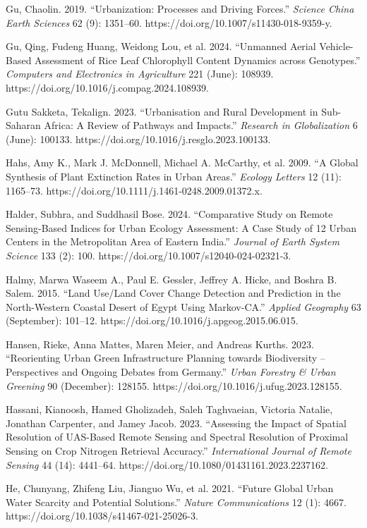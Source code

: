 Gu, Chaolin. 2019. ``Urbanization: Processes and Driving Forces.'' \emph{Science China Earth Sciences} 62 (9): 1351--60. https://doi.org/10.1007/s11430-018-9359-y.

Gu, Qing, Fudeng Huang, Weidong Lou, et al. 2024. ``Unmanned Aerial Vehicle-Based Assessment of Rice Leaf Chlorophyll Content Dynamics across Genotypes.'' \emph{Computers and Electronics in Agriculture} 221 (June): 108939. https://doi.org/10.1016/j.compag.2024.108939.

Gutu Sakketa, Tekalign. 2023. ``Urbanisation and Rural Development in Sub-Saharan Africa: A Review of Pathways and Impacts.'' \emph{Research in Globalization} 6 (June): 100133. https://doi.org/10.1016/j.resglo.2023.100133.

Hahs, Amy K., Mark J. McDonnell, Michael A. McCarthy, et al. 2009. ``A Global Synthesis of Plant Extinction Rates in Urban Areas.'' \emph{Ecology Letters} 12 (11): 1165--73. https://doi.org/10.1111/j.1461-0248.2009.01372.x.

Halder, Subhra, and Suddhasil Bose. 2024. ``Comparative Study on Remote Sensing-Based Indices for Urban Ecology Assessment: A Case Study of 12 Urban Centers in the Metropolitan Area of Eastern India.'' \emph{Journal of Earth System Science} 133 (2): 100. https://doi.org/10.1007/s12040-024-02321-3.

Halmy, Marwa Waseem A., Paul E. Gessler, Jeffrey A. Hicke, and Boshra B. Salem. 2015. ``Land Use/Land Cover Change Detection and Prediction in the North-Western Coastal Desert of Egypt Using Markov-CA.'' \emph{Applied Geography} 63 (September): 101--12. https://doi.org/10.1016/j.apgeog.2015.06.015.

Hansen, Rieke, Anna Mattes, Maren Meier, and Andreas Kurths. 2023. ``Reorienting Urban Green Infrastructure Planning towards Biodiversity -- Perspectives and Ongoing Debates from Germany.'' \emph{Urban Forestry \& Urban Greening} 90 (December): 128155. https://doi.org/10.1016/j.ufug.2023.128155.

Hassani, Kianoosh, Hamed Gholizadeh, Saleh Taghvaeian, Victoria Natalie, Jonathan Carpenter, and Jamey Jacob. 2023. ``Assessing the Impact of Spatial Resolution of UAS-Based Remote Sensing and Spectral Resolution of Proximal Sensing on Crop Nitrogen Retrieval Accuracy.'' \emph{International Journal of Remote Sensing} 44 (14): 4441--64. https://doi.org/10.1080/01431161.2023.2237162.

He, Chunyang, Zhifeng Liu, Jianguo Wu, et al. 2021. ``Future Global Urban Water Scarcity and Potential Solutions.'' \emph{Nature Communications} 12 (1): 4667. https://doi.org/10.1038/s41467-021-25026-3.

